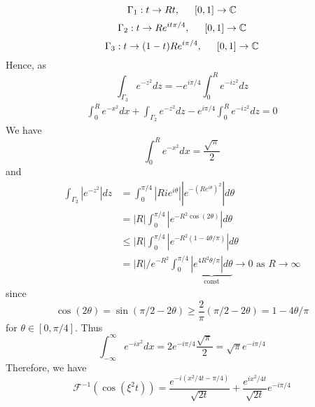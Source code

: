 \documentclass[11pt]{article}
\theoremstyle{mystyle}
\theoremstyle{definition}
\begin{document}
\[
  \Gamma_1:t \to Rt,  \indent [0,1] \to \mathbb{C}
\]
\[
  \Gamma_2:t \to Re^{it\pi/4 },  \indent [0,1] \to \mathbb{C}
\]
\[
  \Gamma_3:t \to (1-t)Re^{i\pi/4},  \indent [0,1] \to \mathbb{C}
\]
Hence, as 
\[
  \int_{\Gamma_3} e^{-z^2} dz = -e^{i\pi/4} \int_0^R e^{-iz^2 } dz
\]
\begin{align*}
  \int_0^R e^{-x^2} dx + \int_{\Gamma_2} e^{-z^2} dz - e^{i\pi/4} \int_0^R e^{-iz^2} dz = 0 
\end{align*}
We have 
\[
  \int_0^R e^{-x^2} dx = \displaystyle\frac{\sqrt{\pi}}{2}
\]
and 
\begin{align*}
  \int_{\Gamma_2} |e^{-z^2}| dz 
  &= \int_0^{\pi/4} \left| R i e^{i\theta}\right| |e^{-\left(Re^{i\theta}\right)^2} | d\theta \\ 
  &= |R| \int_0^{\pi/4} \left|e^{-R^2 \cos\left(2\theta\right)} \right| d\theta \\ 
  &\le |R| \int_0^{\pi/4} \left|e^{-R^2 (1-4\theta/\pi) }\right| d\theta \\ 
  &= |R|/e^{-R^2} \int_0^{\pi/4} \underbrace{\left|e^{4R^2\theta/\pi }\right| d\theta}_{\text{const}} \to 0 \text{ as } R \to \infty
\end{align*}
since 
\[
  \cos(2 \theta) = \sin(\pi/2 - 2\theta) \ge \displaystyle\frac{2}{\pi}(\pi/2 - 2\theta) = 1-4\theta/\pi
\]
for $\theta \in [0,\pi/4]$. 
Thus 
\[
  \int_{-\infty}^\infty e^{-ix^2} dx = 2 e^{-i\pi/4} \displaystyle\frac{\sqrt{\pi}}{2} = \sqrt{\pi} e^{-i\pi/4}   
\]
Therefore, we have 
\[
  \mathcal{F}^{-1}(\cos(\xi^2 t)) = \displaystyle\frac{e^{-i(x^2/4t-\pi/4)}}{\sqrt{2t}} + \displaystyle\frac{e^{ix^2/4t}}{\sqrt{2t}} e^{-i\pi/4}
\]
\end{document}
